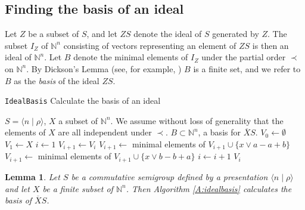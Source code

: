 \documentclass[12pt]{article}
\newtheorem{lemma}{Lemma}
\begin{document}
\subsection{Finding the basis of an ideal}

Let $Z$ be a subset of $S$, and let $ZS$ denote the ideal of 
$S$ generated by $Z$. The subset $I_Z$ of $\mathbb{N}^n$ consisting 
of vectors representing an element of $ZS$ 
is then an ideal of $\mathbb{N}^n$. Let $B$ denote the minimal 
elements of $I_Z$ under the partial order $\prec$ on $\mathbb{N}^n$.
By Dickson's Lemma (see, for example, \cite{bBeckWeis}) $B$ is a finite set,
and we refer to $B$ as the {\em basis} of the ideal $ZS$.

\begin{algorithm}
\caption{{\tt IdealBasis} Calculate the basis of an ideal}
\label{A:idealbasis}
\begin{algorithmic}[1]
\REQUIRE $S = \langle n \mid \rho \rangle$, $X$ a subset of $\mathbb{N}^n$.
We assume without loss of generality that the elements of $X$ are 
all independent under $\prec$.
\ENSURE $B \subset \mathbb{N}^n$, a basis for $\overline{X}S$.
\STATE $V_0 \leftarrow \emptyset$
\STATE $V_1 \leftarrow X$
\STATE $i \leftarrow 1$
        \STATE $V_{i+1} \leftarrow V_i$
                 \label{step:forward}
                        \STATE $V_{i+1} \leftarrow $ minimal elements of 
                                $V_{i+1} \cup \{x \vee a - a + b\}$
                        \STATE $V_{i+1} \leftarrow $ minimal elements of 
                                $V_{i+1} \cup \{x \vee b - b + a\}$
                \ENDFOR
        \ENDFOR
        \STATE $i \leftarrow i + 1$
\ENDWHILE
{} $V_i$
\end{algorithmic}
\end{algorithm}

\begin{lemma}
Let $S$ be a commutative semigroup defined by a presentation $\langle
n\mid\rho\rangle$ and let $X$ be a finite subset of $\mathbb{N}^n$. Then
Algorithm \ref{A:idealbasis} calculates the basis
of $\overline{X}S$.
\end{lemma}
\end{document}
